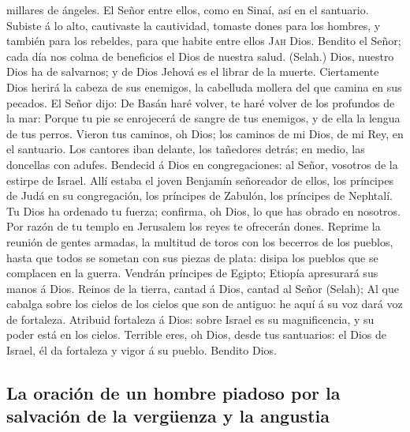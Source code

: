 millares de ángeles. El Señor entre ellos, como en Sinaí, así en el
santuario.  Subiste á lo alto, cautivaste la cautividad,
tomaste dones para los hombres, y también para los rebeldes, para que
habite entre ellos \textsc{Jah} Dios.  Bendito el Señor;
cada día nos colma de beneficios el Dios de nuestra salud. (Selah.)
 Dios, nuestro Dios ha de salvarnos; y de Dios Jehová es
el librar de la muerte.  Ciertamente Dios herirá la
cabeza de sus enemigos, la cabelluda mollera del que camina en sus
pecados.  El Señor dijo: De Basán haré volver, te haré
volver de los profundos de la mar:  Porque tu pie se
enrojecerá de sangre de tus enemigos, y de ella la lengua de tus perros.
 Vieron tus caminos, oh Dios; los caminos de mi Dios, de
mi Rey, en el santuario.  Los cantores iban delante, los
tañedores detrás; en medio, las doncellas con adufes. 
Bendecid á Dios en congregaciones: al Señor, vosotros de la estirpe de
Israel.  Allí estaba el joven Benjamín señoreador de
ellos, los príncipes de Judá en su congregación, los príncipes de
Zabulón, los príncipes de Nephtalí.  Tu Dios ha ordenado
tu fuerza; confirma, oh Dios, lo que has obrado en nosotros.
 Por razón de tu templo en Jerusalem los reyes te
ofrecerán dones.  Reprime la reunión de gentes armadas,
la multitud de toros con los becerros de los pueblos, hasta que todos se
sometan con sus piezas de plata: disipa los pueblos que se complacen en
la guerra.  Vendrán príncipes de Egipto; Etiopía
apresurará sus manos á Dios.  Reinos de la tierra, cantad
á Dios, cantad al Señor (Selah);  Al que cabalga sobre
los cielos de los cielos que son de antiguo: he aquí á su voz dará voz
de fortaleza.  Atribuid fortaleza á Dios: sobre Israel es
su magnificencia, y su poder está en los cielos. 
Terrible eres, oh Dios, desde tus santuarios: el Dios de Israel, él da
fortaleza y vigor á su pueblo. Bendito Dios.

\hypertarget{la-oraciuxf3n-de-un-hombre-piadoso-por-la-salvaciuxf3n-de-la-verguxfcenza-y-la-angustia}{%
\subsection{La oración de un hombre piadoso por la salvación de la
vergüenza y la
angustia}\label{la-oraciuxf3n-de-un-hombre-piadoso-por-la-salvaciuxf3n-de-la-verguxfcenza-y-la-angustia}}

